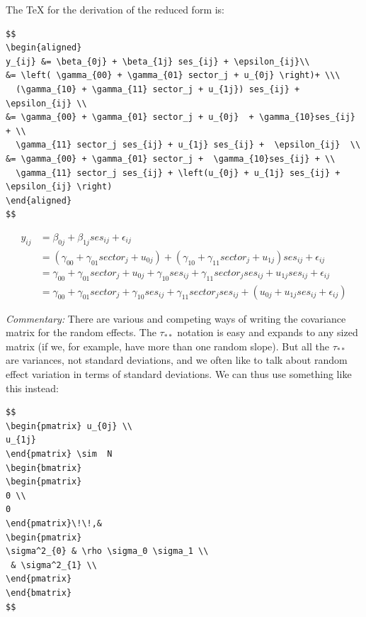 \documentclass[
  letterpaper,
  DIV=11,
  numbers=noendperiod]{scrreprt}
\begin{document}
The TeX for the derivation of the reduced form is:

\begin{verbatim}
$$
\begin{aligned}
y_{ij} &= \beta_{0j} + \beta_{1j} ses_{ij} + \epsilon_{ij}\\
&= \left( \gamma_{00} + \gamma_{01} sector_j + u_{0j} \right)+ \\\
  (\gamma_{10} + \gamma_{11} sector_j + u_{1j}) ses_{ij} +  \epsilon_{ij} \\
&= \gamma_{00} + \gamma_{01} sector_j + u_{0j}  + \gamma_{10}ses_{ij} + \\
  \gamma_{11} sector_j ses_{ij} + u_{1j} ses_{ij} +  \epsilon_{ij}  \\
&= \gamma_{00} + \gamma_{01} sector_j +  \gamma_{10}ses_{ij} + \\
  \gamma_{11} sector_j ses_{ij} + \left(u_{0j} + u_{1j} ses_{ij} + \epsilon_{ij} \right) 
\end{aligned}
$$
\end{verbatim}

\[
\begin{aligned}
y_{ij} &= \beta_{0j} + \beta_{1j} ses_{ij} + \epsilon_{ij}\\
&= \left( \gamma_{00} + \gamma_{01} sector_j + u_{0j} \right)+ (\gamma_{10} + \gamma_{11} sector_j + u_{1j}) ses_{ij} +  \epsilon_{ij} \\
&= \gamma_{00} + \gamma_{01} sector_j + u_{0j}  + \gamma_{10}ses_{ij} + \gamma_{11} sector_j ses_{ij} + u_{1j} ses_{ij} +  \epsilon_{ij}  \\
&= \gamma_{00} + \gamma_{01} sector_j +  \gamma_{10}ses_{ij} + \gamma_{11} sector_j ses_{ij} + \left(u_{0j} + u_{1j} ses_{ij} + \epsilon_{ij} \right) 
\end{aligned}
\]

\emph{Commentary:} There are various and competing ways of writing the
covariance matrix for the random effects. The \(\tau_{**}\) notation is
easy and expands to any sized matrix (if we, for example, have more than
one random slope). But all the \(\tau_{**}\) are variances, not standard
deviations, and we often like to talk about random effect variation in
terms of standard deviations. We can thus use something like this
instead:

\begin{verbatim}
$$
\begin{pmatrix} u_{0j} \\
u_{1j}
\end{pmatrix} \sim  N
\begin{bmatrix}
\begin{pmatrix}
0 \\
0
\end{pmatrix}\!\!,&
\begin{pmatrix}
\sigma^2_{0} & \rho \sigma_0 \sigma_1 \\
 & \sigma^2_{1} \\
\end{pmatrix}
\end{bmatrix}
$$
\end{verbatim}
\end{document}
